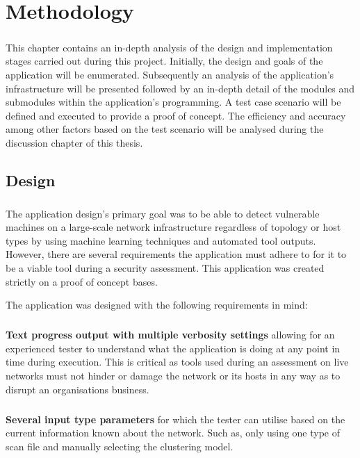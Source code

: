 \chapter{Methodology}
\label{chap:brief}
\paragraph{}This chapter contains an in-depth analysis of the design and implementation stages carried out during this project. Initially, the design and goals of the application will be enumerated. Subsequently an analysis of the application's infrastructure will be presented followed by an in-depth detail of the modules and submodules within the application's programming. A test case scenario will be defined and executed to provide a proof of concept. The efficiency and accuracy among other factors based on the test scenario will be analysed during the discussion chapter of this thesis. 
\section{Design}
\label{sec:design}
\paragraph{}The application design's primary goal was to be able to detect vulnerable machines on a large-scale network infrastructure regardless of topology or host types by using machine learning techniques and automated tool outputs. However, there are several requirements the application must adhere to for it to be a viable tool during a security assessment. This application was created strictly on a proof of concept bases.\linebreak

The application was designed with the following requirements in mind:

\paragraph{}\textbf{Text progress output with multiple verbosity settings} allowing for an experienced tester to understand what the application is doing at any point in time during execution. This is critical as tools used during an assessment on live networks must not hinder or damage the network or its hosts in any way as to disrupt an organisations business.

\paragraph{}\textbf{Several input type parameters} for which the tester can utilise based on the current information known about the network. Such as, only using one type of scan file and manually selecting the clustering model. 

